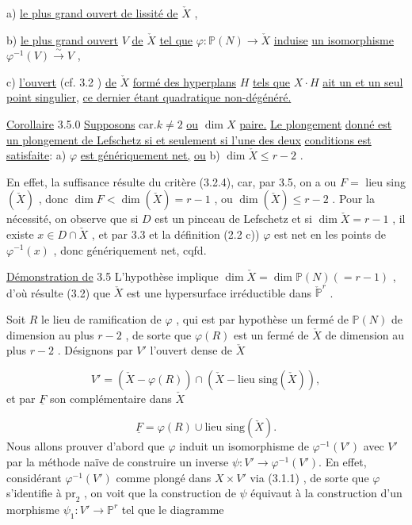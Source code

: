 a) \underline{le plus grand ouvert de lissité de} $\check{X}$ ,

b) \underline{le plus grand ouvert} $V$ \underline{de} $\check{X}$ \underline{tel que} $\varphi : \mathbb{P}(N) \longrightarrow \check{X}$ \underline{induise} \underline{un isomorphisme} $\varphi^{-1}(V) \stackrel{\sim}{\longrightarrow} V$ ,

c) \underline{l'ouvert} (cf. 3.2 ) \underline{de} $\check{X}$ \underline{formé des hyperplans} $H$ \underline{tels que} $X \cdot H$ \underline{ait un et un seul point singulier,} \underline{ce dernier étant quadratique non-dégénéré.}

\underline{Corollaire} 3.5.0 \underline{Supposons} car.$k \neq 2$ \underline{ou} $\dim X$ \underline{paire.} \underline{Le plongement} \underline{donné est un plongement de Lefschetz si et seulement si l'une des deux} \underline{conditions est satisfaite}: a) $\varphi$ \underline{est génériquement net,} \underline{ou} b) $\dim \check{X} \leqslant r-2$ .

En effet, la suffisance résulte du critère (3.2.4), car, par 3.5, on a ou $F =$ lieu sing$(\check{X})$ , donc $\dim F < \dim(\check{X}) = r-1$ , ou $\dim(\check{X}) \leqslant r-2$ . Pour la nécessité, on observe que si $D$ est un pinceau de Lefschetz et si $\dim \check{X} = r-1$ , il existe $x \in D \cap \check{X}$ , et par 3.3 et la définition (2.2 c)) $\varphi$ est net en les points de $\varphi^{-1}(x)$ , donc génériquement net, cqfd.

\underline{Démonstration de} 3.5 L'hypothèse implique $\dim \check{X} = \dim \mathbb{P}(N)(=r-1)$ , d'où résulte (3.2) que $\check{X}$ est une hypersurface irréductible dans $\check{\mathbb{P}}^r$ .



Soit $R$ le lieu de ramification de $\varphi$ , qui est par hypothèse un fermé de $\mathbb{P}(N)$ de dimension au plus $r-2$ , de sorte que $\varphi(R)$ est un fermé de $\check{X}$ de dimension au plus $r-2$ . Désignons par $V'$ l'ouvert dense de $\check{X}$

\begin{equation}\tag{3.5.1}
V' = (\check{X} - \varphi(R)) \cap (\check{X} - \text{lieu sing}(\check{X})) ,
\end{equation}
et par $\underline{F}$ son complémentaire dans $\check{X}$

\begin{equation}\tag{3.5.1.1}
\underline{F} = \varphi(R) \cup \text{lieu sing}(\check{X}) .
\end{equation}
Nous allons prouver d'abord que $\varphi$ induit un isomorphisme de $\varphi^{-1}(V')$ avec $V'$ par la méthode naïve de construire un inverse $\psi : V' \longrightarrow \varphi^{-1}(V')$. En effet, considérant $\varphi^{-1}(V')$ comme plongé dans $X \times V'$ via (3.1.1) , de sorte que $\varphi$ s'identifie à $\mathrm{pr}_2$ , on voit que la construction de $\psi$ équivaut à la construction d'un morphisme $\psi_1 : V' \longrightarrow \mathbb{P}^r$ tel que le diagramme

